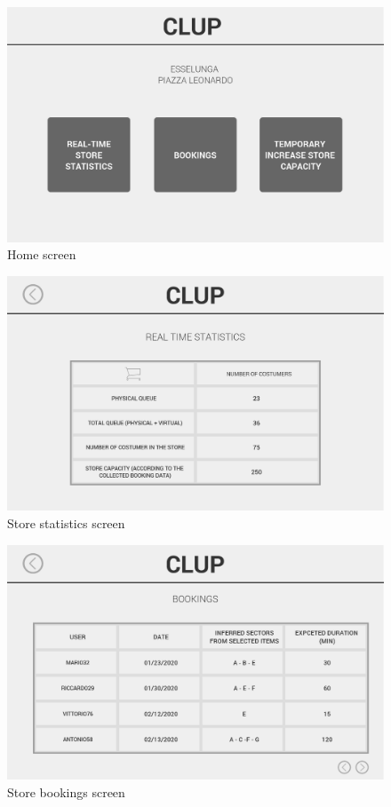 \documentclass[]{article}
\begin{document}
			\begin{figure}[H]
				\centering
				\includegraphics[scale=0.3]{Mockups/webAppHome}
				\caption{Home screen}
				\label{fig:homeScreen}
			\end{figure}
			\bigskip
			
			\begin{figure}[H]
				\centering
				\includegraphics[scale=0.3]{Mockups/storeStatistics}
				\caption{Store statistics screen}
				\label{fig:Storestatisticsscreen}
			\end{figure}
		
			
			\begin{figure}[H]
				\centering
				\includegraphics[scale=0.3]{Mockups/storeBookings}
				\caption{Store bookings screen}
				\label{fig:ManagerHomeMockup}
			\end{figure}
		
\end{document}
